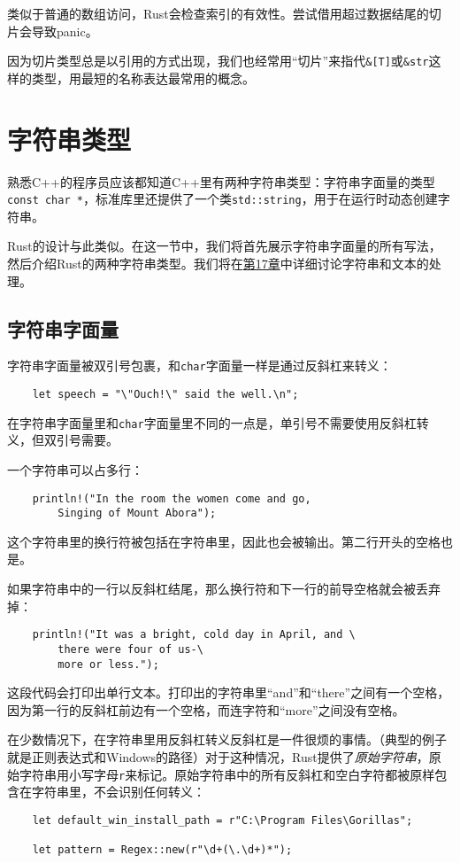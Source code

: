 类似于普通的数组访问，Rust会检查索引的有效性。尝试借用超过数据结尾的切片会导致panic。

因为切片类型总是以引用的方式出现，我们也经常用“切片”来指代\texttt{\&[T]}或\texttt{\&str}这样的类型，用最短的名称表达最常用的概念。

\section{字符串类型}\label{string}

熟悉C++的程序员应该都知道C++里有两种字符串类型：字符串字面量的类型\texttt{const char *}，标准库里还提供了一个类\texttt{std::string}，用于在运行时动态创建字符串。

Rust的设计与此类似。在这一节中，我们将首先展示字符串字面量的所有写法，然后介绍Rust的两种字符串类型。我们将在\hyperref[ch17]{第17章}中详细讨论字符串和文本的处理。

\subsection{字符串字面量}\label{StrLiteral}

字符串字面量被双引号包裹，和\texttt{char}字面量一样是通过反斜杠来转义：
\begin{verbatim}
    let speech = "\"Ouch!\" said the well.\n";
\end{verbatim}

在字符串字面量里和\texttt{char}字面量里不同的一点是，单引号不需要使用反斜杠转义，但双引号需要。

一个字符串可以占多行：
\begin{verbatim}
    println!("In the room the women come and go,
        Singing of Mount Abora");
\end{verbatim}
这个字符串里的换行符被包括在字符串里，因此也会被输出。第二行开头的空格也是。


如果字符串中的一行以反斜杠结尾，那么换行符和下一行的前导空格就会被丢弃掉：
\begin{verbatim}
    println!("It was a bright, cold day in April, and \
        there were four of us-\
        more or less.");
\end{verbatim}
这段代码会打印出单行文本。打印出的字符串里“and”和“there”之间有一个空格，因为第一行的反斜杠前边有一个空格，而连字符和“more”之间没有空格。

在少数情况下，在字符串里用反斜杠转义反斜杠是一件很烦的事情。（典型的例子就是正则表达式和Windows的路径）对于这种情况，Rust提供了\emph{原始字符串}，原始字符串用小写字母\texttt{r}来标记。原始字符串中的所有反斜杠和空白字符都被原样包含在字符串里，不会识别任何转义：
\begin{verbatim}
    let default_win_install_path = r"C:\Program Files\Gorillas";

    let pattern = Regex::new(r"\d+(\.\d+)*");
\end{verbatim}

